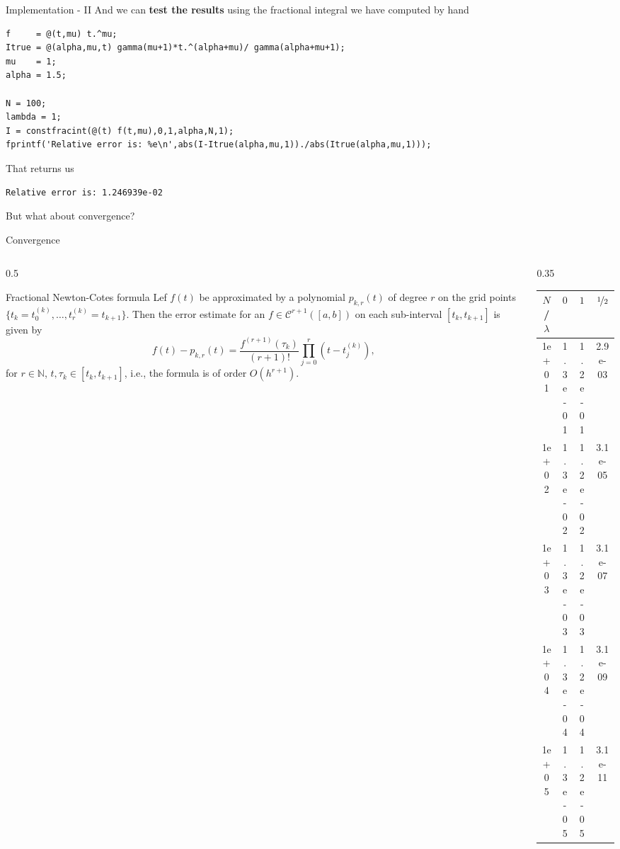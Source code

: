 \documentclass[aspectratio=169,xcolor=dvipsnames]{beamer}
\begin{document}
\begin{frame}[fragile]{Implementation - II}
And we can \textbf{test the results} using the fractional integral we have computed by hand
\begin{verbatim}
f     = @(t,mu) t.^mu;
Itrue = @(alpha,mu,t) gamma(mu+1)*t.^(alpha+mu)/ gamma(alpha+mu+1);
mu    = 1;
alpha = 1.5;

N = 100;
lambda = 1;
I = constfracint(@(t) f(t,mu),0,1,alpha,N,1);
fprintf('Relative error is: %e\n',abs(I-Itrue(alpha,mu,1))./abs(Itrue(alpha,mu,1)));
\end{verbatim}
That returns us
\begin{verbatim}
Relative error is: 1.246939e-02
\end{verbatim}
But \alert{what about convergence}?
\end{frame}

\begin{frame}{Convergence}
\begin{columns}
\begin{column}{0.5\columnwidth}
\begin{block}{Fractional Newton-Cotes formula}
Lef $f(t)$ be approximated by a polynomial $p_{k,r}(t)$ of degree $r$ on the
grid points $\{t_k = t_0^{(k)},\ldots,t_{r}^{(k)} = t_{k+1}\}$. Then the error
estimate for an $f \in \mathcal{C}^{r+1}([a,b])$ on each sub-interval $[t_k,t_{k+1}]$ is given by
\[ f(t)-p_{k,r}(t) = \frac{f^{(r+1)}(\tau_k)}{(r+1)!} \prod_{j=0}^{r} (t - t_j^{(k)}), \]
for $r \in \mathbb{N}$, $t,\tau_k \in [t_k,t_{k+1}]$, i.e., the formula is of order $O(h^{r+1})$.
\end{block}

\end{column}
\begin{column}{0.35\columnwidth}
\scriptsize\centering

\begin{tabular}{cccc}
\toprule
$N$/$\lambda$ & $0$ & $1$ & $\nicefrac{1}{2}$ \\
\midrule
1e+01 & 1.3e-01 & 1.2e-01 & 2.9e-03 \\
1e+02 & 1.3e-02 & 1.2e-02 & 3.1e-05 \\
1e+03 & 1.3e-03 & 1.2e-03 & 3.1e-07 \\
1e+04 & 1.3e-04 & 1.2e-04 & 3.1e-09 \\
1e+05 & 1.3e-05 & 1.2e-05 & 3.1e-11 \\
\bottomrule
\end{tabular}
\end{column}
\end{columns}
\end{frame}
\end{document}
